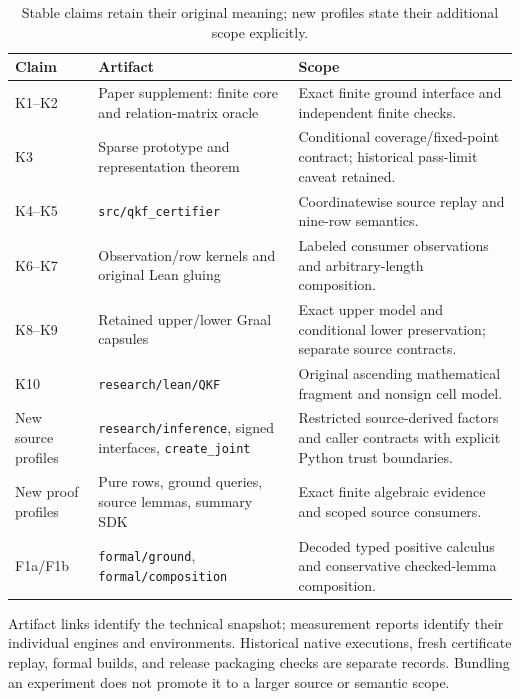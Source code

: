 \begin{table}[htbp]\small
\begin{tabularx}{\textwidth}{@{}>{\raggedright\arraybackslash}p{}>{\raggedright\arraybackslash}X>{\raggedright\arraybackslash}X@{}}
\toprule
Claim & Artifact & Scope\\
\midrule
K1--K2 & Paper supplement: finite core and relation-matrix oracle & Exact finite ground interface and independent finite checks.\\
K3 & Sparse prototype and representation theorem & Conditional coverage/fixed-point contract; historical pass-limit caveat retained.\\
K4--K5 & \texttt{src/qkf\_certifier} & Coordinatewise source replay and nine-row semantics.\\
K6--K7 & Observation/row kernels and original Lean gluing & Labeled consumer observations and arbitrary-length composition.\\
K8--K9 & Retained upper/lower Graal capsules & Exact upper model and conditional lower preservation; separate source contracts.\\
K10 & \texttt{research/lean/QKF} & Original ascending mathematical fragment and nonsign cell model.\\
New source profiles & \texttt{research/inference}, signed interfaces, \texttt{create\_joint} & Restricted source-derived factors and caller contracts with explicit Python trust boundaries.\\
New proof profiles & Pure rows, ground queries, source lemmas, summary SDK & Exact finite algebraic evidence and scoped source consumers.\\
F1a/F1b & \texttt{formal/ground}, \texttt{formal/composition} & Decoded typed positive calculus and conservative checked-lemma composition.\\
\bottomrule
\end{tabularx}
\caption{Stable claims retain their original meaning; new profiles state their additional scope explicitly.}\label{tab:traceability}
\end{table}

Artifact links identify the technical snapshot; measurement reports identify their individual engines and environments. Historical native executions, fresh certificate replay, formal builds, and release packaging checks are separate records. Bundling an experiment does not promote it to a larger source or semantic scope.
